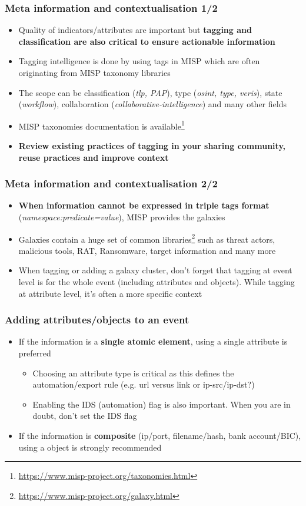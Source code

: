 \begin{frame}
\frametitle{Meta information and contextualisation 1/2}
\begin{itemize}
\item Quality of indicators/attributes are important but {\bf tagging and classification are also critical to ensure actionable information}
        \item Tagging intelligence is done by using tags in MISP which are often originating from MISP taxonomy libraries
        \item The scope can be classification ({\it tlp, PAP}), type ({\it osint, type, veris}), state ({\it workflow}), collaboration ({\it collaborative-intelligence}) and many other fields
        \item MISP taxonomies documentation is available\footnote{\url{https://www.misp-project.org/taxonomies.html}}
        \item {\bf Review existing practices of tagging in your sharing community, reuse practices and improve context}
\end{itemize}
\end{frame}

\begin{frame}
\frametitle{Meta information and contextualisation 2/2}
\begin{itemize}
        \item {\bf When information cannot be expressed in triple tags format} ({\it namespace:predicate=value}), MISP provides the galaxies
        \item Galaxies contain a huge set of common libraries\footnote{\url{https://www.misp-project.org/galaxy.html}} such as threat actors, malicious tools, RAT, Ransomware, target information and many more
        \item When tagging or adding a galaxy cluster, don't forget that tagging at event level is for the whole event (including attributes and objects). While tagging at attribute level, it's often a more specific context
\end{itemize}
\end{frame}

\begin{frame}
\frametitle{Adding attributes/objects to an event}
\begin{itemize}
        \item If the information is a {\bf single atomic element}, using a single attribute is preferred
                \begin{itemize}
                        \item Choosing an attribute type is critical as this defines the automation/export rule (e.g. url versus link or ip-src/ip-dst?)
                        \item Enabling the IDS (automation) flag is also important. When you are in doubt, don't set the IDS flag
                \end{itemize}
        \item If the information is {\bf composite} (ip/port, filename/hash, bank account/BIC), using a object is strongly recommended
\end{itemize}
\end{frame}

